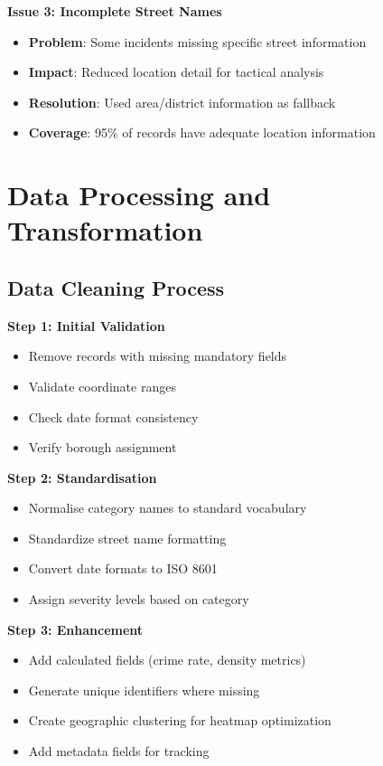 \documentclass[12pt,a4paper]{article}
\begin{document}
\textbf{Issue 3: Incomplete Street Names}
\begin{itemize}
    \item \textbf{Problem}: Some incidents missing specific street information
    \item \textbf{Impact}: Reduced location detail for tactical analysis
    \item \textbf{Resolution}: Used area/district information as fallback
    \item \textbf{Coverage}: 95\% of records have adequate location information
\end{itemize}

\section{Data Processing and Transformation}

\subsection{Data Cleaning Process}

\textbf{Step 1: Initial Validation}
\begin{itemize}
    \item Remove records with missing mandatory fields
    \item Validate coordinate ranges
    \item Check date format consistency
    \item Verify borough assignment
\end{itemize}

\textbf{Step 2: Standardisation}
\begin{itemize}
    \item Normalise category names to standard vocabulary
    \item Standardize street name formatting
    \item Convert date formats to ISO 8601
    \item Assign severity levels based on category
\end{itemize}

\textbf{Step 3: Enhancement}
\begin{itemize}
    \item Add calculated fields (crime rate, density metrics)
    \item Generate unique identifiers where missing
    \item Create geographic clustering for heatmap optimization
    \item Add metadata fields for tracking
\end{itemize}
\end{document}
